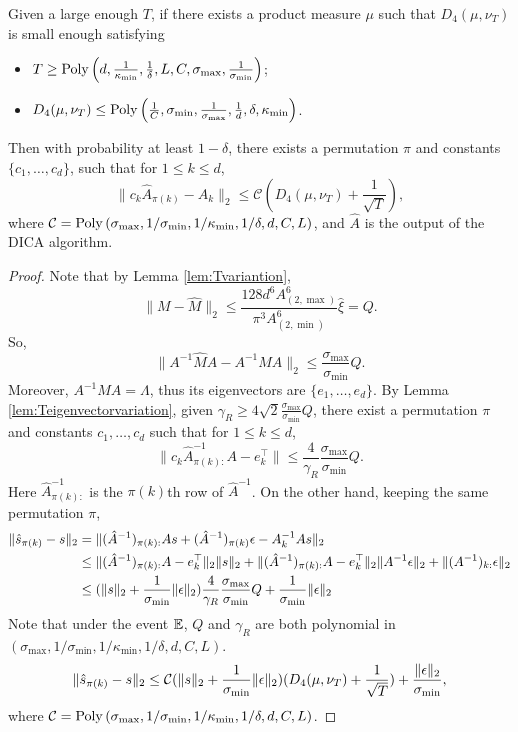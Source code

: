  Given a large enough $T$, if there exists a product measure $\mu$  such that  $D_4(\mu, \nu_T)$ is small enough satisfying
\begin{itemize}
\vspace{-3mm}
\item $T \ge \operatorname{Poly}\left(d, \frac{1}{\kappa_{\min}}, \frac{1}{\delta}, L, C, \sigma_{\max}, \frac{1}{\sigma_{\min}}\right)$;
\item $D_4(\mu, \nu_T) \le \operatorname{Poly}\left(\frac{1}{C},  \sigma_{\min},  \frac{1}{\sigma_{\max}},\frac{1}{d}, \delta, \kappa_{\min}\right)$.
\end{itemize}
\vspace{-2mm}
Then with probability at least $1-\delta$, there exists a permutation $\pi$ and constants $\{c_1,\ldots,c_d\}$, such that for $1\le k\le d$,
\[
\| c_k\hat{A}_{\pi(k)} - A_k\|_2 \le \mathcal{C}\left(D_4(\mu, \nu_T)+\frac{1}{\sqrt{T}}\right),
\]
where $\mathcal{C} = \operatorname{Poly}\left(\sigma_{\max}, 1/\sigma_{\min}, 1/\kappa_{\min},1/\delta, d, C, L\right)$, and $\hat{A}$ is the output of the DICA algorithm.
\begin{proof}
Note that by Lemma \ref{lem:Tvariantion},
\[
\|M - \hat{M}\|_2 \le  \frac{128d^6A^6_{(2,\max)}}{\pi^3 A^6_{(2,\min)}}\hat{\xi} = Q.
\]
So, 
\[
\|A^{-1}\hat{M}A -A^{-1}MA \|_2 \le \frac{\sigma_{\max}}{\sigma_{\min}}Q.
\]
Moreover, $A^{-1}MA = \Lambda$, thus its eigenvectors are $\{e_1,\ldots,e_d\}$.
By Lemma \ref{lem:Teigenvectorvariation}, given $\gamma_R \ge 4\sqrt{2} \frac{\sigma_{\max}}{\sigma_{\min}}Q$, there exist a permutation $\pi$ and constants ${c_1,\ldots,c_d}$ such that for $1\le k\le d$,
\[
\|c_k\hat{A}^{-1}_{\pi(k):}A - e_k^{\top}\| \le \frac{4}{\gamma_R}\frac{\sigma_{\max}}{\sigma_{\min}}Q.
\]
Here $\hat{A}^{-1}_{\pi(k):}$ is the $\pi(k)$th row of $\hat{A}^{-1}$.
On the other hand, keeping the same permutation $\pi$,
\begin{align*}
\| \hat{s}_{\pi(k)} - s \|_2 & = \|(\hat{A}^{-1})_{\pi(k):}As + (\hat{A}^{-1})_{\pi(k)}\epsilon - A^{-1}_kAs \|_2 \\
& \le \|(\hat{A}^{-1})_{\pi(k):}A - e_k^{\top}\|_2\|s\|_2 + \|(\hat{A}^{-1})_{\pi(k):}A - e_k^{\top}\|_2\|A^{-1}\epsilon\|_2 + \|(A^{-1})_{k:}\epsilon\|_2 \\
& \le (\|s\|_2+\frac{1}{\sigma_{\min}}\|\epsilon\|_2)\frac{4}{\gamma_R}\frac{\sigma_{\max}}{\sigma_{\min}}Q + \frac{1}{\sigma_{\min}}\|\epsilon\|_2
\end{align*}  
Note that under the event $\mathbb{E}$,  $Q$ and $\gamma_R$ are both polynomial in $(\sigma_{\max}, 1/\sigma_{\min}, 1/\kappa_{\min},1/\delta, d, C, L)$. 
\[
\| \hat{s}_{\pi(k)} - s \|_2 \le \mathcal{C}(\|s\|_2+\frac{1}{\sigma_{\min}}\|\epsilon\|_2)(D_4(\mu,\nu_T)+\frac{1}{\sqrt{T}})+\frac{\|\epsilon\|_2}{\sigma_{\min}},
\]
where $\mathcal{C} = \operatorname{Poly}\left(\sigma_{\max}, 1/\sigma_{\min}, 1/\kappa_{\min},1/\delta, d, C, L\right)$.
\end{proof}
\fi

